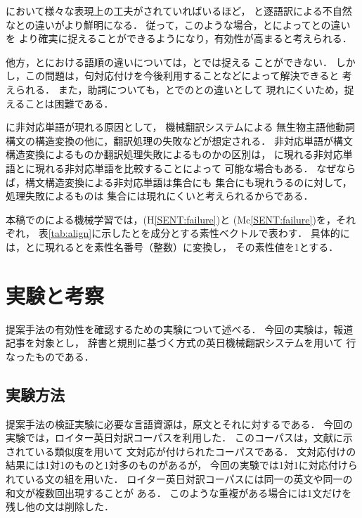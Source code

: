 \documentclass[japanese]{jnlp_1.4}
\newcommand{\AL}{}
\newcommand{\NAL}{}
\newcommand{\HUM}{}
\newcommand{\MT}{}
\newcommand{\SVM}{}
\begin{document}
{\HUM}において様々な表現上の工夫がされていればいるほど，
{\HUM}と逐語訳による不自然な{\MT}との違いがより鮮明になる．
従って，このような場合，{\AL}と{\NAL}によって{\HUM}と{\MT}の違いを
より確実に捉えることができるようになり，有効性が高まると考えられる．

他方，{\HUM}と{\MT}における語順の違いについては，{\AL}と{\NAL}では捉える
ことができない．
しかし，この問題は，句対応付けを今後利用することなどによって解決できると
考えられる．
また，助詞についても，{\HUM}と{\MT}での{\AL}と{\NAL}の違いとして
現れにくいため，捉えることは困難である．  

{\MT}に非対応単語が現れる原因として，
機械翻訳システムによる
無生物主語他動詞構文の構造変換の他に，翻訳処理の失敗などが想定される．
非対応単語が構文構造変換によるものか翻訳処理失敗によるものかの区別は，
{\MT}に現れる非対応単語と{\HUM}に現れる非対応単語を比較することによって
可能な場合もある．
なぜならば，構文構造変換による非対応単語は{\MT}集合にも
{\HUM}集合にも現れうるのに対して，処理失敗によるものは
{\HUM}集合には現れにくいと考えられるからである．

本稿での{\SVM}による機械学習では，{\HUM}(H\ref{SENT:failure})と
{\MT}(Mc\ref{SENT:failure})を，それぞれ，
表\ref{tab:align}に示した{\AL}と{\NAL}を成分とする素性ベクトルで表わす．
具体的には，{\HUM}と{\MT}に現れる{\AL}と{\NAL}を素性名番号（整数）に変換し，
その素性値を1とする．


\section{実験と考察}
\label{sec:experiment}

提案手法の有効性を確認するための実験について述べる．
今回の実験は，報道記事を対象とし，
辞書と規則に基づく方式の英日機械翻訳システムを用いて
行なったものである．



\subsection{実験方法}
\label{sec:experiment:setting}


提案手法の検証実験に必要な言語資源は，原文とそれに対する{\HUM}である．
今回の実験では，ロイター英日対訳コーパスを利用した．
このコーパスは，文献\cite{Uchiyama03}に示されている類似度を用いて
文対応が付けられたコーパスである．
文対応付けの結果には1対1のものと1対多のものがあるが，
今回の実験では1対1に対応付けられている文の組を用いた．
ロイター英日対訳コーパスには同一の英文や同一の和文が複数回出現することが
ある．
このような重複がある場合には1文だけを残し他の文は削除した．
\end{document}
